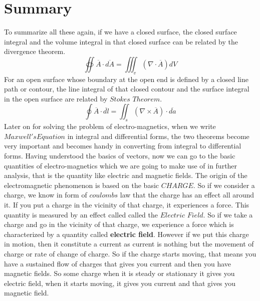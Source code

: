 \section{Summary}
To summarize all these again, if we have a closed surface, the closed surface integral and the volume integral in that closed surface can be related by the divergence theorem.
\begin{equation}
\oiint \overline{A}\cdot\overline{dA} = \iiint_v(\nabla\cdot\overline{A})dV
\end{equation}
For an open surface whose boundary at the open end is defined by a closed line path or contour, the line integral of that closed contour and the surface integral in the open surface are related by $Stokes$ $Theorem$.
\begin{equation}
\oint\overline{A}\cdot\overline{dl} = \iint_s(\nabla\times\overline{A})\cdot\overline{da}
\end{equation}	
Later on for solving the problem of electro-magnetics, when we write $Maxwell's Equation$ in integral and differential forms, the two theorems become very important and becomes handy in converting from integral to differential forms. Having understood the basics of vectors, now we can go to the basic quantities of electro-magnetics which we are going to make use of in further analysis, that is the quantity like electric and magnetic fields.\newline
The origin of the electromagnetic phenomenon is based on the basic $CHARGE$. So if we consider a charge, we know in form of $coulombs$ law that the charge has an effect all around it. If you put a charge in the vicinity of that charge, it experiences a force. This quantity is measured by an effect called called the $Electric$ $Field$.
So if we take a charge and go in the vicinity of that charge, we experience a force which is characterized by a quantity called \textbf{electric field}. However if we put this charge in motion, then it constitute a current as current is nothing but the movement of charge or rate of change of charge.\newline
So if the charge starts moving, that means you have a sustained flow of charges that gives you current and then you have magnetic fields. So some charge when it is steady or stationary it gives you electric field, when it starts moving, it gives you current and that gives you magnetic field.\newline
